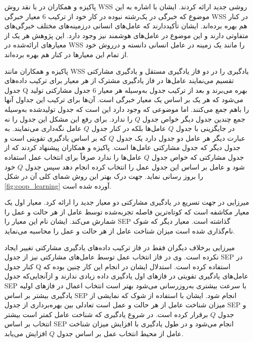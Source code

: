 پاکیزه و همکاران در  با نقد روش WSS روشی جدید ارائه کردند. ایشان با اشاره به این موضوع که خبرگی در یک‌رشته نبوده در کار خود از ترکیب 6 معیار خبرگی WSS در کنار هم بهره برده‌اند. ایشان تأکیددارند که عامل‌های انسانی درزمینه‌های مختلف خبرگی‌های متفاوتی دارند و این موضوع در عامل‌های هوشمند نیز وجود دارد. این پژوهش هر یک از معیارهای ارائه‌شده در WSS را مانند یک زمینه در عامل انسانی دانسته و درروش خود از تمام این معیارها در کنار هم بهره برده‌اند.

پاکیزه و همکاران مانند WSS یادگیری را در دو فاز یادگیری مستقل و یادگیری مشارکتی تقسیم می‌نمایند عامل‌ها در فاز یادگیری مشترک از هر معیار برای ترکیب داده‌های جدول Q بهره می‌برند و بعد از ترکیب جدول به‌وسیله هر معیار 6 جدول مشارکتی تولید می‌شود که هر یک بر اساس یک معیار خبرگی است. آن‌ها برای ترکیب این جداول آنها را باهم جمع می‌کنند. اما موضوعی که وجود دارد این است که جدول تولیدشده به‌وسیله جمع چندین جدول دیگر خواص جدول $Q$ را ندارد. برای رفع این مشکل این جدول را نه در جایگزینی با جدول $Q$ عامل‌ها بلکه در کنار جدول $Q$ عامل نگه‌داری می‌نمایند. به عبارت دیگر هر عامل دو جدول دارد یک جدول $Q$ که بر اساس یادگیری تقویتی است و جدول دیگر که جدول مشارکتی عامل‌ها است. پاکیزه و همکاران پیشنهاد کردند که از جدول مشارکتی که خواص جدول $Q$ عامل‌ها را ندارد صرفاً برای انتخاب عمل استفاده شود و عامل بر اساس این جدول عمل را انتخاب کرده انجام دهد سپس جدول $Q$ خود را بروز رسانی نماید. جهت درک بهتر این روش شمای کلی آن در شکل \ref{fig:coop_learning} آورده شده است.


میرزایی در  جهت تسریع در یادگیری مشارکتی دو معیار جدید را ارائه کرد. معیار اول یک معیار مکاشفه است که کوتاه‌ترین فاصله تجربه‌شده توسط عامل از هر حالت و عمل را شمارش می‌کند. ایشان نام این معیار را SEP گذاشته است. معیار دیگر که شوک نام‌گذاری شده است میزان شناخت عامل از هر حالت و عمل را محاسبه می‌نماید.

میرزایی برخلاف دیگران فقط در فاز ترکیب داده‌های یادگیری مشارکتی تغییر ایجاد نکرده است. وی در فاز انتخاب عمل توسط عامل‌های مشارکتی نیز از جدول SEP در کنار جدول Q استفاده کرده است. استدلال ایشان در انجام این کار چنین بوده که عامل‌های یادگیری تقویتی در فازهای اول یادگیری داده زیادی ندارند و ازآنجایی‌که جدول SEP با سرعت بیشتری به‌روزرسانی می‌شود بهتر است انتخاب اعمال در فازهای اولیه یادگیری بیشتر بر اساس SEP انجام شود. ایشان با استفاده از شوک که نمایشی از میزان شناخت عامل از هر حالت و عمل است تعادلی بین بهره‌برداری از جدول SEP و جدول $Q$ برقرار کرده است. در شروع یادگیری که شناخت عامل کمتر است بیشتر انتخاب بر اساس SEP انجام می‌شود و در طول یادگیری با افزایش میزان شناخت عامل از محیط انتخاب عمل بر اساس جدول $Q$ افزایش می‌یابد.

